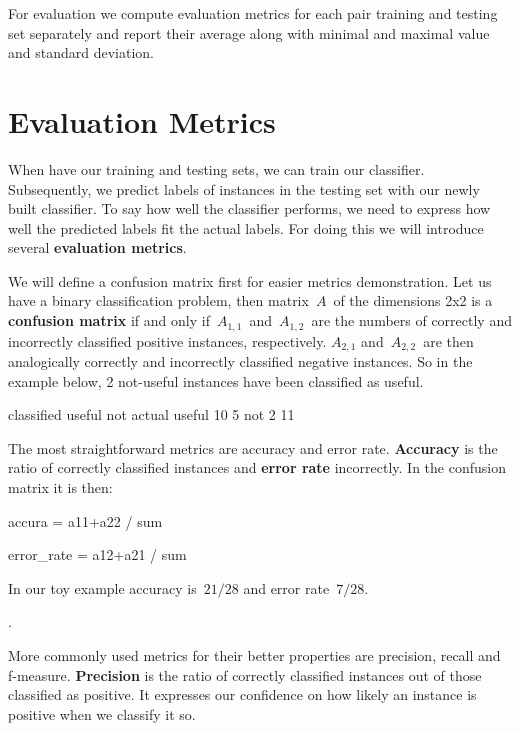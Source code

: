 For evaluation we compute evaluation metrics for each pair training and testing set separately and report their average along with minimal and maximal value and standard deviation.



\section{Evaluation Metrics}

When have our training and testing sets, we can train our classifier.
Subsequently, we predict labels of instances in the testing set with our newly
built classifier.
To say how well the classifier performs, we need to express how well the predicted
labels fit the actual labels.
For doing this we will introduce several {\bf evaluation metrics}.

We will define a confusion matrix first for easier metrics demonstration.
Let us have a binary classification problem, then matrix~$A$~of the dimensions 2x2 is a {\bf confusion matrix} if and only if~$A_{1,1}$~and~$A_{1,2}$~are the numbers of correctly and incorrectly classified positive instances, respectively. $A_{2,1}$ and~$A_{2,2}$~are then analogically correctly and incorrectly classified negative instances.
So in the example below, 2 not-useful instances have been classified as useful.

\begin{code}
        classified    useful       not
actual
useful                 10          5
not                     2         11
\end{code}


The most straightforward metrics are accuracy and error rate.
{\bf Accuracy} is the ratio of correctly classified instances and {\bf error rate} incorrectly.
In the confusion matrix it is then:



accura = a11+a22 / sum

error\_rate = a12+a21 / sum

In our toy example accuracy is~$21/28$ and error rate~$7/28$.

.

More commonly used metrics for their better properties are precision, recall and f-measure.
{\bf Precision} is the ratio of correctly classified instances out of those classified as positive.
It expresses our confidence on how likely an instance is positive when we classify it so.

